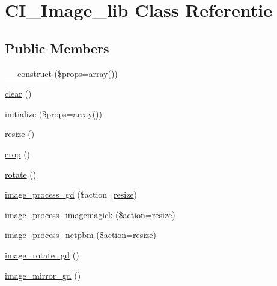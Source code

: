 \hypertarget{class_c_i___image__lib}{}\section{C\+I\+\_\+\+Image\+\_\+lib Class Referentie}
\label{class_c_i___image__lib}
\subsection*{Public Members}
\begin{DoxyCompactItemize}
\item 
\mbox{\hyperlink{class_c_i___image__lib_a563262d396a1cef6153c9998d77bb548}{\+\_\+\+\_\+construct}} (\$props=array())
\item 
\mbox{\hyperlink{class_c_i___image__lib_aa821bec12eaa7e0f649397c9675ff505}{clear}} ()
\item 
\mbox{\hyperlink{class_c_i___image__lib_a0bccf32e3d2d283de0521949330cb969}{initialize}} (\$props=array())
\item 
\mbox{\hyperlink{class_c_i___image__lib_a94e38a7d478ce07200a52c51497e598e}{resize}} ()
\item 
\mbox{\hyperlink{class_c_i___image__lib_a77248c0134d1b117eb36774ecee6e04c}{crop}} ()
\item 
\mbox{\hyperlink{class_c_i___image__lib_a74e94d71195d9cbb9c9e3bca3353d912}{rotate}} ()
\item 
\mbox{\hyperlink{class_c_i___image__lib_aa8ef6ef7b931a663dd906ce27236c6fd}{image\+\_\+process\+\_\+gd}} (\$action=\textquotesingle{}\mbox{\hyperlink{class_c_i___image__lib_a94e38a7d478ce07200a52c51497e598e}{resize}}\textquotesingle{})
\item 
\mbox{\hyperlink{class_c_i___image__lib_a141ec7c2c7cbe7a9a6a913d12fe973da}{image\+\_\+process\+\_\+imagemagick}} (\$action=\textquotesingle{}\mbox{\hyperlink{class_c_i___image__lib_a94e38a7d478ce07200a52c51497e598e}{resize}}\textquotesingle{})
\item 
\mbox{\hyperlink{class_c_i___image__lib_ab40d1235dccf0611ef4fe5a6b0272dd3}{image\+\_\+process\+\_\+netpbm}} (\$action=\textquotesingle{}\mbox{\hyperlink{class_c_i___image__lib_a94e38a7d478ce07200a52c51497e598e}{resize}}\textquotesingle{})
\item 
\mbox{\hyperlink{class_c_i___image__lib_ae0d52ef7503342a0a1c56c99da140446}{image\+\_\+rotate\+\_\+gd}} ()
\item 
\mbox{\hyperlink{class_c_i___image__lib_a3f6d47ec077726da699890d4644797ad}{image\+\_\+mirror\+\_\+gd}} ()
\item 

\end{DoxyCompactItemize}
